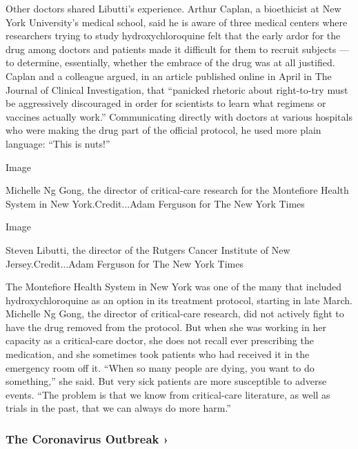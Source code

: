 Other doctors shared Libutti's experience. Arthur Caplan, a bioethicist
at New York University's medical school, said he is aware of three
medical centers where researchers trying to study hydroxychloroquine
felt that the early ardor for the drug among doctors and patients made
it difficult for them to recruit subjects --- to determine, essentially,
whether the embrace of the drug was at all justified. Caplan and a
colleague argued, in an article published online in April in The Journal
of Clinical Investigation, that ``panicked rhetoric about right-to-try
must be aggressively discouraged in order for scientists to learn what
regimens or vaccines actually work.'' Communicating directly with
doctors at various hospitals who were making the drug part of the
official protocol, he used more plain language: ``This is nuts!''

Image

Michelle Ng Gong, the director of critical-care research for the
Montefiore Health System in New York.Credit...Adam Ferguson for The New
York Times

Image

Steven Libutti, the director of the Rutgers Cancer Institute of New
Jersey.Credit...Adam Ferguson for The New York Times

The Montefiore Health System in New York was one of the many that
included hydroxychloroquine as an option in its treatment protocol,
starting in late March. Michelle Ng Gong, the director of critical-care
research, did not actively fight to have the drug removed from the
protocol. But when she was working in her capacity as a critical-care
doctor, she does not recall ever prescribing the medication, and she
sometimes took patients who had received it in the emergency room off
it. ``When so many people are dying, you want to do something,'' she
said. But very sick patients are more susceptible to adverse events.
``The problem is that we know from critical-care literature, as well as
trials in the past, that we can always do more harm.''

\href{https://www.nytimes.com/news-event/coronavirus?action=click\&pgtype=Article\&state=default\&region=MAIN_CONTENT_3\&context=storylines_faq}{}

\hypertarget{the-coronavirus-outbreak-}{%
\subsubsection{The Coronavirus Outbreak
›}\label{the-coronavirus-outbreak-}}

